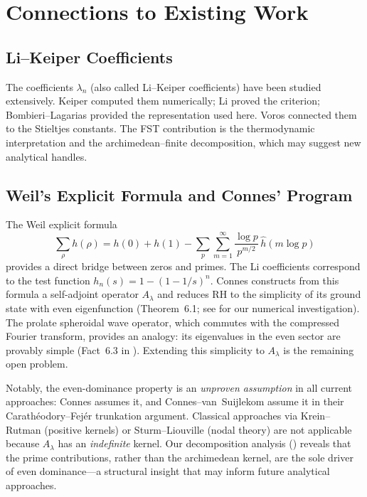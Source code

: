 \documentclass[12pt,a4paper]{article}
\theoremstyle{definition}
\theoremstyle{remark}
\begin{document}
\section{Connections to Existing Work}

\subsection{Li--Keiper Coefficients}
The coefficients $\lambda_n$ (also called Li--Keiper coefficients) have been studied extensively. Keiper \cite{Keiper1992} computed them numerically; Li \cite{Li1997} proved the criterion; Bombieri--Lagarias \cite{BombieriLagarias1999} provided the representation used here. Voros \cite{Voros2004} connected them to the Stieltjes constants. The FST contribution is the thermodynamic interpretation and the archimedean--finite decomposition, which may suggest new analytical handles.

\subsection{Weil's Explicit Formula and Connes' Program}
The Weil explicit formula
\[ \sum_\rho h(\rho) = h(0) + h(1) - \sum_p \sum_{m=1}^\infty \frac{\log p}{p^{m/2}}\,\hat{h}(m\log p) \]
provides a direct bridge between zeros and primes. The Li coefficients correspond to the test function $h_n(s) = 1-(1-1/s)^n$. Connes \cite{Connes2025} constructs from this formula a self-adjoint operator $A_\lambda$ and reduces RH to the simplicity of its ground state with even eigenfunction (Theorem~6.1; see  for our numerical investigation). The prolate spheroidal wave operator, which commutes with the compressed Fourier transform, provides an analogy: its eigenvalues in the even sector are provably simple (Fact~6.3 in \cite{Connes2025}). Extending this simplicity to $A_\lambda$ is the remaining open problem.

Notably, the even-dominance property is an \emph{unproven assumption} in all current approaches: Connes \cite{Connes2025} assumes it, and Connes--van~Suijlekom \cite{ConnesvS2025} assume it in their Carath\'eodory--Fej\'er trunkation argument. Classical approaches via Krein--Rutman (positive kernels) or Sturm--Liouville (nodal theory) are not applicable because $A_\lambda$ has an \emph{indefinite} kernel. Our decomposition analysis () reveals that the prime contributions, rather than the archimedean kernel, are the sole driver of even dominance---a structural insight that may inform future analytical approaches.
\end{document}
